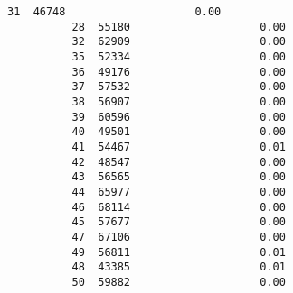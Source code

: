 \documentclass[11pt]{article}
\begin{document}
\begin{Verbatim}[commandchars=\\\{\}]
          31  46748                    0.00                                     
          28  55180                    0.00                                     
          32  62909                    0.00                                     
          35  52334                    0.00                                     
          36  49176                    0.00                                     
          37  57532                    0.00                                     
          38  56907                    0.00                                     
          39  60596                    0.00                                     
          40  49501                    0.00                                     
          41  54467                    0.01                                     
          42  48547                    0.00                                     
          43  56565                    0.00                                     
          44  65977                    0.00                                     
          46  68114                    0.00                                     
          45  57677                    0.00                                     
          47  67106                    0.00                                     
          49  56811                    0.01                                     
          48  43385                    0.01                                     
          50  59882                    0.00                                     
          

\end{Verbatim}
\end{document}
